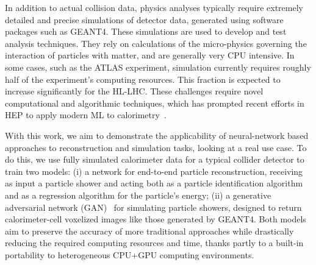 In addition to actual collision data, physics analyses typically require extremely detailed and precise simulations of detector data, generated using software packages such as GEANT4\cite{GEANT4}. These simulations are used to develop and test analysis techniques. They rely on calculations of the micro-physics governing the interaction of particles with matter, and are generally very CPU intensive. In some cases, such as the ATLAS experiment, simulation currently requires roughly half of the experiment's computing resources\cite{GEANT_usage}. This fraction is expected to increase significantly for the HL-LHC. These challenges require novel computational and algorithmic techniques, which has prompted recent efforts in HEP to apply modern ML to calorimetry~\cite{ML1,ML2,ML3,ML4}.

With this work, we aim to demonstrate the applicability of neural-network based approaches to reconstruction and simulation tasks, looking at a real use case. To do this, we use fully simulated calorimeter data for a typical collider detector to train two models: (i) a network for end-to-end particle reconstruction, receiving as input a particle shower and acting both as a particle identification algorithm and as a regression algorithm for the particle's energy; (ii) a generative adversarial network (GAN)~\cite{Goodfellow} for simulating particle showers, designed to return calorimeter-cell voxelized images like those generated by GEANT4.
Both models aim to preserve the accuracy of more traditional approaches while drastically reducing the required computing resources and time, thanks partly to a built-in portability to heterogeneous CPU+GPU computing environments.


